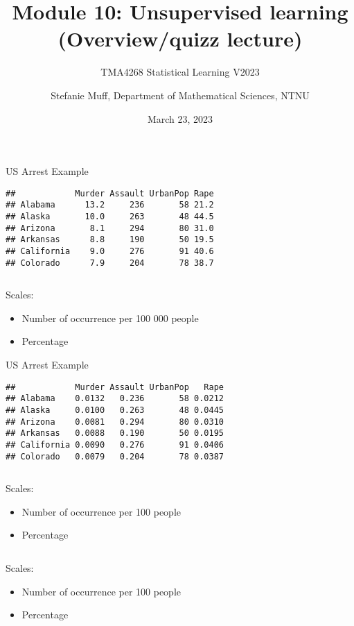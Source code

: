 \documentclass[
  10pt,
  ignorenonframetext,
]{beamer}
\title{Module 10: Unsupervised learning (Overview/quizz lecture)}
\subtitle{TMA4268 Statistical Learning V2023}
\author{Stefanie Muff, Department of Mathematical Sciences, NTNU}
\date{March 23, 2023}
\providecommand{\tightlist}{%
  \setlength{\itemsep}{0pt}\setlength{\parskip}{0pt}}
\begin{document}
\frame{\titlepage}

\begin{frame}[fragile]
\begin{block}{US Arrest Example}
\protect\hypertarget{us-arrest-example}{}
\(~\)

\begin{verbatim}
##            Murder Assault UrbanPop Rape
## Alabama      13.2     236       58 21.2
## Alaska       10.0     263       48 44.5
## Arizona       8.1     294       80 31.0
## Arkansas      8.8     190       50 19.5
## California    9.0     276       91 40.6
## Colorado      7.9     204       78 38.7
\end{verbatim}

\(~\)

Scales:

\begin{itemize}
\tightlist
\item
  Number of occurrence per 100 000 people
\item
  Percentage
\end{itemize}
\end{block}
\end{frame}

\begin{frame}[fragile]
\begin{block}{US Arrest Example}
\protect\hypertarget{us-arrest-example-1}{}
\(~\)

\begin{verbatim}
##            Murder Assault UrbanPop   Rape
## Alabama    0.0132   0.236       58 0.0212
## Alaska     0.0100   0.263       48 0.0445
## Arizona    0.0081   0.294       80 0.0310
## Arkansas   0.0088   0.190       50 0.0195
## California 0.0090   0.276       91 0.0406
## Colorado   0.0079   0.204       78 0.0387
\end{verbatim}

\(~\)

Scales:

\begin{itemize}
\tightlist
\item
  Number of occurrence per 100 people
\item
  Percentage
\end{itemize}

\(~\)

Scales:

\begin{itemize}
\tightlist
\item
  Number of occurrence per 100 people
\item
  Percentage
\end{itemize}
\end{block}
\end{frame}
\end{document}
